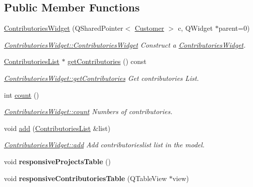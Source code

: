 \subsection*{Public Member Functions}
\begin{DoxyCompactItemize}
\item 
\hyperlink{classGui_1_1Widgets_1_1ContributoriesWidget_a5517afc134491eb118b9d183e94476bc}{Contributories\-Widget} (Q\-Shared\-Pointer$<$ \hyperlink{classModels_1_1Customer}{Customer} $>$ c, Q\-Widget $\ast$parent=0)
\begin{DoxyCompactList}\small\item\em \hyperlink{classGui_1_1Widgets_1_1ContributoriesWidget_a5517afc134491eb118b9d183e94476bc}{Contributories\-Widget\-::\-Contributories\-Widget} Construct a \hyperlink{classGui_1_1Widgets_1_1ContributoriesWidget}{Contributories\-Widget}. \end{DoxyCompactList}\item 
\hyperlink{classModels_1_1ContributoriesList}{Contributories\-List} $\ast$ \hyperlink{classGui_1_1Widgets_1_1ContributoriesWidget_a72c0f4a49aaafdf045154bafb1e76049}{get\-Contributories} () const 
\begin{DoxyCompactList}\small\item\em \hyperlink{classGui_1_1Widgets_1_1ContributoriesWidget_a72c0f4a49aaafdf045154bafb1e76049}{Contributories\-Widget\-::get\-Contributories} Get contributories List. \end{DoxyCompactList}\item 
int \hyperlink{classGui_1_1Widgets_1_1ContributoriesWidget_a7c9f1bfcac92d4813f1d43b46319042b}{count} ()
\begin{DoxyCompactList}\small\item\em \hyperlink{classGui_1_1Widgets_1_1ContributoriesWidget_a7c9f1bfcac92d4813f1d43b46319042b}{Contributories\-Widget\-::count} Numbers of contributories. \end{DoxyCompactList}\item 
void \hyperlink{classGui_1_1Widgets_1_1ContributoriesWidget_ae61498391d4aaf199bed8183961d515c}{add} (\hyperlink{classModels_1_1ContributoriesList}{Contributories\-List} \&list)
\begin{DoxyCompactList}\small\item\em \hyperlink{classGui_1_1Widgets_1_1ContributoriesWidget_ae61498391d4aaf199bed8183961d515c}{Contributories\-Widget\-::add} Add contributorieslist {\itshape list} in the model. \end{DoxyCompactList}\item 
\hypertarget{classGui_1_1Widgets_1_1ContributoriesWidget_a734aa654bd463683e900486a6ab27ea1}{void {\bfseries responsive\-Projects\-Table} ()}\label{classGui_1_1Widgets_1_1ContributoriesWidget_a734aa654bd463683e900486a6ab27ea1}

\item 
\hypertarget{classGui_1_1Widgets_1_1ContributoriesWidget_a7302971f64977ee3ade54611570add8d}{void {\bfseries responsive\-Contributories\-Table} (Q\-Table\-View $\ast$view)}\label{classGui_1_1Widgets_1_1ContributoriesWidget_a7302971f64977ee3ade54611570add8d}

\end{DoxyCompactItemize}


